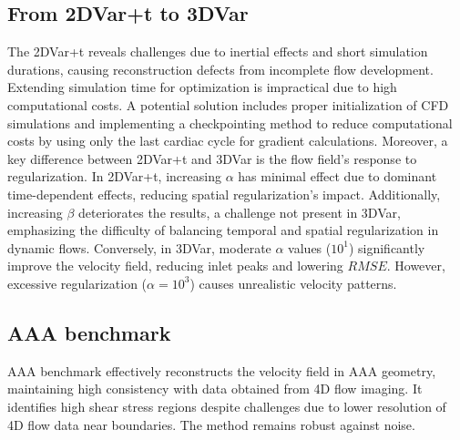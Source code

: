 \subsection*{From 2DVar+t to 3DVar}
The 2DVar+t reveals challenges due to inertial effects and short simulation durations, causing reconstruction defects from incomplete flow development. Extending simulation time for optimization is impractical due to high computational costs. A potential solution includes proper initialization of CFD simulations and implementing a checkpointing method to reduce computational costs by using only the last cardiac cycle for gradient calculations.
Moreover, a key difference between 2DVar+t and 3DVar is the flow field's response to regularization. In 2DVar+t, increasing $\alpha$ has minimal effect due to dominant time-dependent effects, reducing spatial regularization's impact. Additionally, increasing $\beta$ deteriorates the results, a challenge not present in 3DVar, emphasizing the difficulty of balancing temporal and spatial regularization in dynamic flows. Conversely, in 3DVar, moderate $\alpha$ values ($10^{1}$) significantly improve the velocity field, reducing inlet peaks and lowering \(RMSE\). However, excessive regularization ($\alpha = 10^{3}$) causes unrealistic velocity patterns. 

\subsection*{AAA benchmark}
AAA benchmark effectively reconstructs the velocity field in AAA geometry, maintaining high consistency with data obtained from 4D flow
imaging. It identifies high shear stress regions despite challenges due to lower resolution of 4D flow data near boundaries. The method remains robust against noise. 

